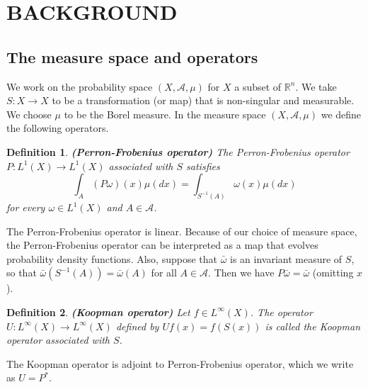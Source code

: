 \documentclass[twocolumn,10pt]{asme2e}
\newtheorem{definition}{Definition}
\begin{document}
\section*{BACKGROUND}%

\subsection*{The measure space and operators}

We work on the probability space $(X,\mathcal{A},\mu)$ for $X$ a
subset of $\mathbb{R}^n$. We take $S: X \to X$ to be a transformation
(or map) that is non-singular and measurable. We choose $\mu$ to be
the Borel measure. In the measure space $(X,\mathcal{A},\mu)$ we
define the following operators.


\begin{definition} \textbf{(Perron-Frobenius operator)}
The Perron-Frobenius operator $P:L^1(X) \to L^1(X)$ associated with
$S$ satisfies
\begin{equation}
  \int_A (P \omega)(x)\mu(dx) = \int_{S^{-1}(A)} \omega(x)\mu(dx)
\end{equation}
for every $\omega \in L^1(X)$ and $A \in \mathcal{A}$.
\end{definition}
The Perron-Frobenius operator is linear. Because of our choice of
measure space, the Perron-Frobenius operator can be interpreted as a
map that evolves probability density functions. Also, suppose that
$\bar{\omega}$ is an invariant measure of $S$, so that
$\bar{\omega}(S^{-1}(A)) = \bar{\omega}(A)$ for all $A \in
\mathcal{A}$.  Then we have $P \bar{\omega} = \bar{\omega}$ (omitting
$x$).

\begin{definition} \textbf{(Koopman operator)}
Let $f \in L^\infty(X)$. The operator $U:L^{\infty}(X) \to
L^{\infty}(X)$ defined by $Uf(x) = f(S(x))$ is called the Koopman
operator associated with $S$.
\end{definition}
The Koopman operator is adjoint to Perron-Frobenius operator, which we
write as $U = P^*$.
\end{document}
